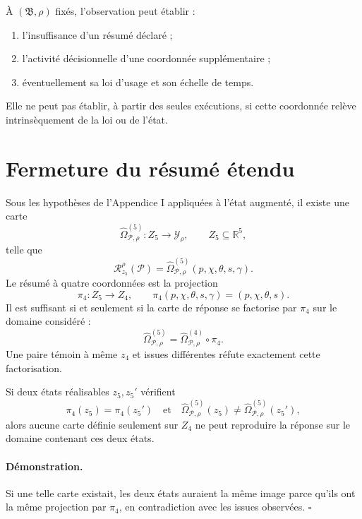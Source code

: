 \begin{encadre}[title={Corollaire \theproposition{} --- Détectable comme horloge, indécidable comme ontologie}]
À $(\mathfrak B,\rho)$ fixés, l'observation peut établir :
\begin{enumerate}
\item l'insuffisance d'un résumé déclaré ;
\item l'activité décisionnelle d'une coordonnée supplémentaire ;
\item éventuellement sa loi d'usage et son échelle de temps.
\end{enumerate}
Elle ne peut pas établir, à partir des seules exécutions, si cette
coordonnée relève intrinsèquement de la loi ou de l'état.
\end{encadre}

\section{Fermeture du résumé étendu}
\label{annexe-K-fermeture}

Sous les hypothèses de l'Appendice I appliquées à l'état augmenté, il
existe une carte
\[
\widehat\Omega^{(5)}_{\mathcal P,\rho}:
Z_5\longrightarrow\mathcal Y_\rho,
\qquad
Z_5\subseteq\mathbb R^5,
\]
telle que
\[
\mathcal R^{\rho}_{z_5}(\mathcal P)
=
\widehat\Omega^{(5)}_{\mathcal P,\rho}(p,\chi,\theta,s,\gamma).
\]
Le résumé à quatre coordonnées est la projection
\[
\pi_4:Z_5\to Z_4,
\qquad
\pi_4(p,\chi,\theta,s,\gamma)=(p,\chi,\theta,s).
\]
Il est suffisant si et seulement si la carte de réponse se factorise par
$\pi_4$ sur le domaine considéré :
\[
\widehat\Omega^{(5)}_{\mathcal P,\rho}
=
\widehat\Omega^{(4)}_{\mathcal P,\rho}\circ\pi_4.
\]
Une paire témoin à même $z_4$ et issues différentes réfute exactement
cette factorisation.

\begin{encadre}[title={Proposition \theproposition{} --- Critère de nécessité de la cinquième coordonnée}]
Si deux états réalisables $z_5,z_5'$ vérifient
\[
\pi_4(z_5)=\pi_4(z_5')
\quad\text{et}\quad
\widehat\Omega^{(5)}_{\mathcal P,\rho}(z_5)\neq
\widehat\Omega^{(5)}_{\mathcal P,\rho}(z_5'),
\]
alors aucune carte définie seulement sur $Z_4$ ne peut reproduire la
réponse sur le domaine contenant ces deux états.
\end{encadre}

\paragraph{Démonstration.}
Si une telle carte existait, les deux états auraient la même image parce
qu'ils ont la même projection par $\pi_4$, en contradiction avec les
issues observées. \hfill$\square$

